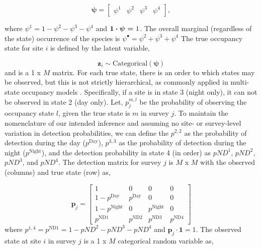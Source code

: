 \documentclass[12pt]{article}
\begin{document}
\begin{equation}
\boldsymbol{\psi} = \begin{bmatrix} \psi^1 & \psi^2 & \psi^3 & \psi^4 \end{bmatrix}, %
\end{equation}

where  $\psi^{1} = 1 - \psi^{2} - \psi^{3} - \psi^{4}$ and $\boldmath{1} \cdot \boldsymbol{\psi} = \text{1}$. The overall marginal (regardless of the state) occurrence of the species is $\psi^{\bullet} = \psi^{2} + \psi^{3} + \psi^{4}$ The true occupancy state for site $i$ is defined by the latent variable,

\begin{equation}
\textbf{z}_{i} \sim \text{Categorical}(\boldsymbol{\psi})
\end{equation}
and is a 1 x $M$ matrix. For each true state, there is an order to which states may be observed, but this is not strictly hierarchical, as commonly applied in multi-state occupancy models \citep{nichols2007}. Specifically, if a site is in state 3 (night only), it can not be observed in state 2 (day only). Let,  $p^{m,l}_{j}$ be the probability of observing the occupancy state $l$, given the true state is $m$ in survey $j$. To maintain the nomenclature of our intended inference and assuming no site- or survey-level variation in detection probabilities, we can define the $p^{2,2}$ as the probability of detection during the day ($p^{\text{Day}}$), $p^{3,3}$ as the probability of detection during the night ($p^{\text{Night}}$), and the detection probability in state 4 (in order) as $pND^{1}$, $pND^{2}$, $pND^{3}$, and $pND^{4}$. The detection matrix for survey $j$ is $M$ x $M$ with the observed (columns) and true state (row) as,

\begin{equation}
\boldsymbol{p}_{j} = \begin{bmatrix} 1 & 0 & 0 & 0 \\ 
									1-p^{\text{Day}} & p^{\text{Day}} & 0 & 0 \\ 
									1-p^{\text{Night}} & 0 & p^{\text{Night}} & 0\\
  								      p^{\text{ND1}} & p^{\text{ND2}} & p^{\text{ND3}} & p^{\text{ND4}}
  								      \end{bmatrix}
\end{equation}
where $p^{1,4} = p^{\text{ND1}} = 1-pND^{2} - pND^{3} -pND^{4}$ and $\boldsymbol{p}_{j} \cdot \boldsymbol{1} = 1$. The observed state at site $i$ in survey $j$ is a 1 x $M$ categorical random variable as,
\end{document}
